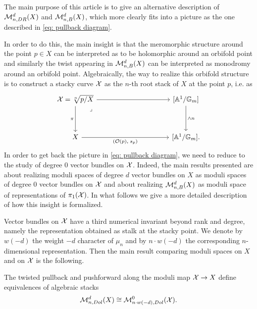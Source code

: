 \documentclass{article}
\begin{document}
The main purpose of this article is to give an alternative description of $\mathcal{M}_{n, DR}^d(X)$ and $\mathcal{M}_{n, B}^d(X)$, which more clearly fits into a picture as the one described in \eqref{eq: pullback diagram}.

In order to do this, the main insight is that the meromorphic structure around the point $p \in X$ can be interpreted as to be holomorphic around an orbifold point and similarly the twist appearing in $\mathcal{M}_{n,B}^d(X)$ can be interpreted as monodromy around an orbifold point. Algebraically, the way to realize this orbifold structure is to construct a stacky curve $\mathcal{X}$ as the $n$-th root stack of $X$ at the point $p$, i.e. as
\begin{equation}
    \begin{tikzcd}[ampersand replacement=\&, column sep=huge, row sep=huge]
            {\XX= \sqrt[n]{p/X} } \&\& {[\Ab^1/\Gb_m]} \\
            X \& {} \& {[\Ab^1/\Gb_m].}
            \arrow[from=1-1, to=1-3]
            \arrow["\pi"', from=1-1, to=2-1]
            \arrow["\lrcorner"{anchor=center, pos=0.125}, draw=none, from=1-1, to=2-2]
            \arrow["{\wedge n}", from=1-3, to=2-3]
            \arrow["{(\O(p), \; s_p)}"', from=2-1, to=2-3]
    \end{tikzcd}
\end{equation}
In order to get back the picture in \eqref{eq: pullback diagram}, we need to reduce to the study of degree $0$ vector bundles on $\mathcal{X}$. Indeed, the main results presented are about realizing moduli spaces of degree $d$ vector bundles on $X$ as moduli spaces of degree $0$ vector bundles on $\mathcal{X}$ and about realizing $\mathcal{M}_{n, B}^d(X)$ as moduli space of representations of $\pi_1(\mathcal{X})$.
In what follows we give a more detailed description of how this insight is formalized.

Vector bundles on $\mathcal{X}$ have a third numerical invariant beyond rank and degree, namely the representation obtained as stalk at the stacky point. We denote by $w(-d)$ the weight $-d$ character of $\mu_n$ and by $n \cdot w(-d)$ the corresponding $n$-dimensional representation. Then the main result comparing moduli spaces on $X$ and on $\mathcal{X}$ is the following.
\begin{introthm}
The twisted pullback and pushforward along the moduli map $\mathcal{X} \to X$ define equivalences of algebraic stacks
\begin{equation}
\mathcal{M}_{n, Dol}^d(X) \cong \mathcal{M}_{n \cdot w(-d), Dol}^0(\mathcal{X}).
\end{equation}
\end{introthm}
\end{document}
